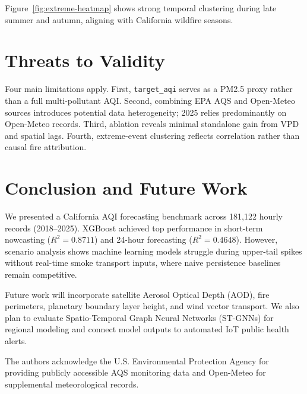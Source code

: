 \documentclass[pdflatex,sn-mathphys-num]{sn-jnl}
\begin{document}
Figure~\ref{fig:extreme-heatmap} shows strong temporal clustering during late summer and autumn, aligning with California wildfire seasons.

\section{Threats to Validity}\label{sec:threats}
Four main limitations apply. First, \texttt{target\_aqi} serves as a PM2.5 proxy rather than a full multi-pollutant AQI. Second, combining EPA AQS and Open-Meteo sources introduces potential data heterogeneity; 2025 relies predominantly on Open-Meteo records. Third, ablation reveals minimal standalone gain from VPD and spatial lags. Fourth, extreme-event clustering reflects correlation rather than causal fire attribution.

\section{Conclusion and Future Work}\label{sec:conclusion}
We presented a California AQI forecasting benchmark across 181,122 hourly records (2018--2025). XGBoost achieved top performance in short-term nowcasting ($R^2 = 0.8711$) and 24-hour forecasting ($R^2 = 0.4648$). However, scenario analysis shows machine learning models struggle during upper-tail spikes without real-time smoke transport inputs, where naive persistence baselines remain competitive.

Future work will incorporate satellite Aerosol Optical Depth (AOD), fire perimeters, planetary boundary layer height, and wind vector transport. We also plan to evaluate Spatio-Temporal Graph Neural Networks (ST-GNNs) for regional modeling and connect model outputs to automated IoT public health alerts.

\backmatter

The authors acknowledge the U.S. Environmental Protection Agency for providing publicly accessible AQS monitoring data and Open-Meteo for supplemental meteorological records.
\end{document}
